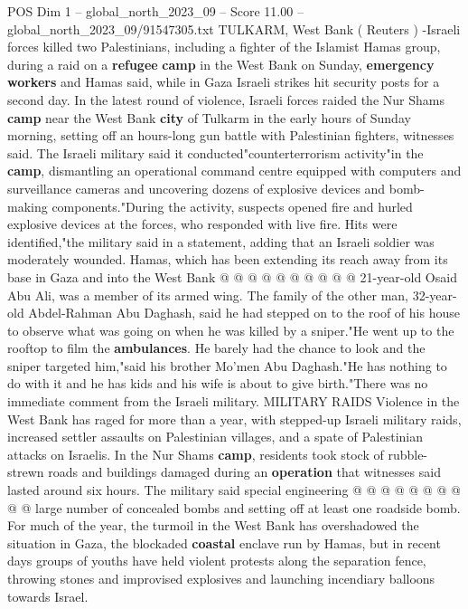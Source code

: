 \begin{textsample}{POS Dim 1 – global\_north\_2023\_09 – Score 11.00 – global\_north\_2023\_09/91547305.txt}  \label{ex:f1_pos_356}
TULKARM, West Bank ( Reuters ) -Israeli forces killed two Palestinians, including a fighter of the Islamist Hamas group, during a raid on a \textbf{refugee} \textbf{camp} in the West Bank on Sunday, \textbf{emergency} \textbf{workers} and Hamas said, while in Gaza Israeli strikes hit security posts for a second day.
In the latest round of violence, Israeli forces raided the Nur Shams \textbf{camp} near the West Bank \textbf{city} of Tulkarm in the early hours of Sunday morning, setting off an hours-long gun battle with Palestinian fighters, witnesses said.
The Israeli military said it conducted"counterterrorism activity"in the \textbf{camp}, dismantling an operational command centre equipped with computers and surveillance cameras and uncovering dozens of explosive devices and bomb-making components."During the activity, suspects opened fire and hurled explosive devices at the forces, who responded with live fire.
Hits were identified,"the military said in a statement, adding that an Israeli soldier was moderately wounded.
Hamas, which has been extending its reach away from its base in Gaza and into the West Bank @ @ @ @ @ @ @ @ @ @ 21-year-old Osaid Abu Ali, was a member of its armed wing.
The family of the other man, 32-year-old Abdel-Rahman Abu Daghash, said he had stepped on to the roof of his house to observe what was going on when he was killed by a sniper."He went up to the rooftop to film the \textbf{ambulances}.
He barely had the chance to look and the sniper targeted him,"said his brother Mo'men Abu Daghash."He has nothing to do with it and he has kids and his wife is about to give birth."There was no immediate comment from the Israeli military.
MILITARY RAIDS Violence in the West Bank has raged for more than a year, with stepped-up Israeli military raids, increased settler assaults on Palestinian villages, and a spate of Palestinian attacks on Israelis.
In the Nur Shams \textbf{camp}, residents took stock of rubble-strewn roads and buildings damaged during an \textbf{operation} that witnesses said lasted around six hours.
The military said special engineering @ @ @ @ @ @ @ @ @ @ large number of concealed bombs and setting off at least one roadside bomb.
For much of the year, the turmoil in the West Bank has overshadowed the situation in Gaza, the blockaded \textbf{coastal} enclave run by Hamas, but in recent days groups of youths have held violent protests along the separation fence, throwing stones and improvised explosives and launching incendiary balloons towards Israel.

\end{textsample}
